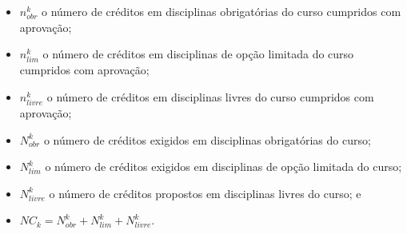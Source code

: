 \begin{itemize}
\begin{itemize}
\item $n^k_{obr}$ o número de créditos em disciplinas obrigatórias do curso cumpridos com
aprovação;
\item $n^k_{lim}$ o número de créditos em disciplinas de opção limitada do curso cumpridos
com aprovação;
\item $n^k_{livre}$ o número de créditos em disciplinas livres do curso cumpridos com
aprovação;
\item $N^k_{obr}$ o número de créditos exigidos em disciplinas obrigatórias do curso;
\item $N^k_{lim}$ o número de créditos exigidos em disciplinas de opção limitada do curso;
\item $N^k_{livre}$ o número de créditos propostos em disciplinas livres do curso; e
\item $NC_k = N^k_{obr} + N^k_{lim} + N^k_{livre}$.
\end{itemize}
\end{itemize}
